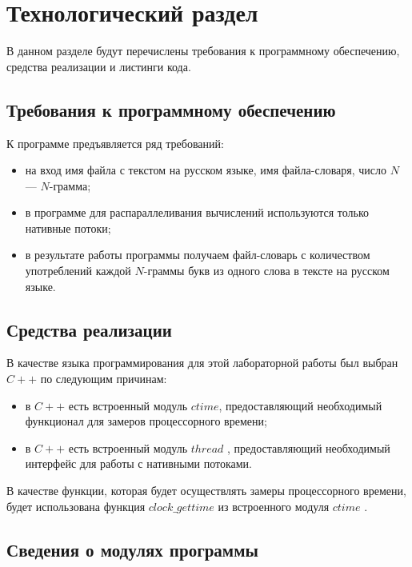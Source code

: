 \chapter{Технологический раздел}

В данном разделе будут перечислены требования к программному обеспечению, средства реализации и листинги кода.

\section{Требования к программному обеспечению}

К программе предъявляется ряд требований:

\begin{itemize} [label=--]
	\item на вход имя файла с текстом на русском языке, имя файла-словаря, число $N$ --- $N$-грамма;
	\item в программе для распараллеливания вычислений используются только нативные потоки;
	\item в результате работы программы получаем файл-словарь с количеством употреблений каждой $N$-граммы букв из одного слова в тексте на русском языке.
\end{itemize}

\section{Средства реализации}

В качестве языка программирования для этой лабораторной работы был выбран $C++$ \cite{pl} по следующим причинам:

\begin{itemize}[label=--]
	\item в $C++$ есть встроенный модуль $ctime$, предоставляющий необходимый функционал для замеров процессорного времени;
	\item в $C++$ есть встроенный модуль $thread$ \cite{info_thread}, предоставляющий необходимый интерфейс для работы с нативными потоками.
\end{itemize}

В качестве функции, которая будет осуществлять замеры процессорного времени, будет использована функция $clock\_gettime$ из встроенного модуля $ctime$ \cite{cpu_time_func}.

\section{Сведения о модулях программы}

